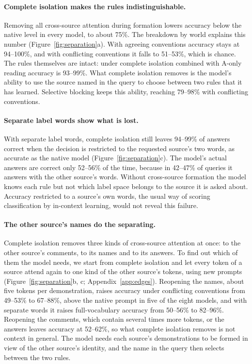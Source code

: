 \documentclass[11pt]{article}
\begin{document}
\paragraph{Complete isolation makes the rules indistinguishable.}
Removing all cross-source attention during formation lowers accuracy below the native level in every model, to about 75\%.
The breakdown by world explains this number (Figure~\ref{fig:separation}a).
With agreeing conventions accuracy stays at 94--100\%, and with conflicting conventions it falls to 51--53\%, which is chance.
The rules themselves are intact: under complete isolation combined with A-only reading accuracy is 93--99\%.
What complete isolation removes is the model's ability to use the source named in the query to choose between two rules that it has learned.
Selective blocking keeps this ability, reaching 79--98\% with conflicting conventions.



\paragraph{Separate label words show what is lost.}
With separate label words, complete isolation still leaves 94--99\% of answers correct when the decision is restricted to the requested source's two words, as accurate as the native model (Figure~\ref{fig:separation}c).
The model's actual answers are correct only 52--56\% of the time, because in 42--47\% of queries it answers with the other source's words.
Without cross-source formation the model knows each rule but not which label space belongs to the source it is asked about.
Accuracy restricted to a source's own words, the usual way of scoring classification by in-context learning, would not reveal this failure.

\paragraph{The other source's names do the separating.}
Complete isolation removes three kinds of cross-source attention at once: to the other source's comments, to its names and to its answers.
To find out which of them the model needs, we start from complete isolation and let every token of a source attend again to one kind of the other source's tokens, using new prompts (Figure~\ref{fig:separation}b, c; Appendix~\ref{app:edges}).
Reopening the names, about five tokens per demonstration, raises accuracy under conflicting conventions from 49--53\% to 67--88\%, above the native prompt in five of the eight models, and with separate words it raises full-vocabulary accuracy from 50--56\% to 82--96\%.
Reopening the comments, which contain several times more tokens, or the answers leaves accuracy at 52--62\%, so what complete isolation removes is not context in general.
The model needs each source's demonstrations to be formed in view of the other source's identity, and the name in the query then selects between the two rules.
\end{document}
